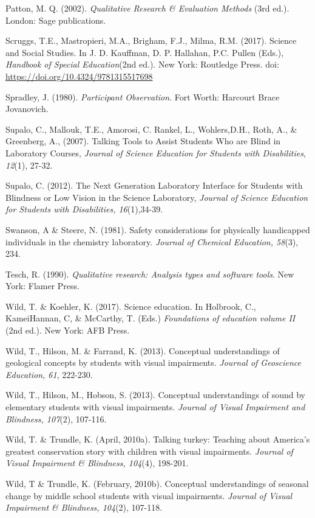 \documentclass[11.5pt]{sig-alternate}
\begin{document}
\begin{large}
Patton, M. Q. (2002).\textit{ Qualitative Research \& Evaluation Methods }(3rd ed.). London: Sage publications.

Scruggs, T.E., Mastropieri, M.A., Brigham, F.J., Milma, R.M. (2017). Science and Social Studies. In J. D. Kauffman, D. P. Hallahan, P.C. Pullen (Eds.), \textit{Handbook of Special Education}(2nd ed.). New York: Routledge Press. doi: \url{https://doi.org/10.4324/9781315517698}

Spradley, J. (1980). \textit{Participant Observation}. Fort Worth: Harcourt Brace Jovanovich.

Supalo, C., Mallouk, T.E., Amorosi, C. Rankel, L., Wohlers,D.H., Roth, A., \& Greenberg, A., (2007). Talking Tools to Assist Students Who are Blind in Laboratory Courses, \textit{Journal of Science Education for Students with Disabilities, 12}(1), 27-32.

Supalo, C. (2012). The Next Generation Laboratory Interface for Students with Blindness or Low Vision in the Science Laboratory, \textit{Journal of Science Education for Students with Disabilities, 16}(1),34-39. 

Swanson, A \& Steere, N. (1981). Safety considerations for physically handicapped individuals in the chemistry laboratory.\textit{ Journal of Chemical Education, 58}(3), 234.

Tesch, R. (1990). \textit{Qualitative research: Analysis types and software tools}. New York: Flamer          Press.

Wild, T. \& Koehler, K. (2017). Science education. In Holbrook, C., KameiHannan, C, \& McCarthy, T. (Eds.) \textit{Foundations of education volume II }(2nd ed.). New York: AFB Press.

Wild, T., Hilson, M. \& Farrand, K. (2013). Conceptual understandings of geological concepts by students with visual impairments. \textit{Journal of Geoscience Education, 61}, 222-230. 

Wild, T., Hilson, M., Hobson, S. (2013). Conceptual understandings of sound by elementary students with visual impairments. \textit{Journal of Visual Impairment and Blindness, 107}(2), 107-116. 

Wild, T. \& Trundle, K. (April, 2010a). Talking turkey: Teaching about America’s greatest conservation story with children with visual impairments. \textit{Journal of Visual Impairment \& Blindness, 104}(4), 198-201. 

Wild, T \& Trundle, K. (February, 2010b). Conceptual understandings of seasonal change by middle school students with visual impairments. \textit{Journal of Visual Impairment \& Blindness, 104}(2), 107-118.


\end{large}
\end{document}
